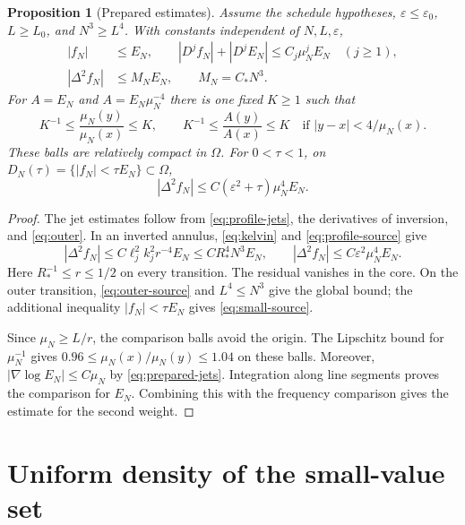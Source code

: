 \documentclass[11pt,twoside,leqno]{article}
\numberwithin{equation}{section}
\newtheorem{proposition}[theorem]{Proposition}
\theoremstyle{definition}
\theoremstyle{remark}
\newcommand{\eps}{\varepsilon}
\newcommand{\Om}{\Omega}
\begin{document}
\begin{proposition}[Prepared estimates]\label{prop:prepared}
Assume the schedule hypotheses, $\eps\le\eps_0$, $L\ge L_0$, and
$N^3\ge L^4$. With constants independent of $N,L,\eps$,
\begin{align}
 |f_N|&\le E_N,\qquad
 |D^jf_N|+|D^jE_N|\le C_j\mu_N^jE_N\quad(j\ge1),
                                                    \label{eq:prepared-jets}\\
 |\Delta^2f_N|&\le M_NE_N,\qquad M_N=C_*N^3.         \label{eq:global-source}
\end{align}
For $A=E_N$ and $A=E_N\mu_N^{-4}$ there is one fixed $K\ge1$ such that
\begin{equation}\label{eq:comparison}
 K^{-1}\le\frac{\mu_N(y)}{\mu_N(x)}\le K,\qquad
 K^{-1}\le\frac{A(y)}{A(x)}\le K
 \quad\text{if }|y-x|<4/\mu_N(x).
\end{equation}
These balls are relatively compact in $\Om$. For $0<\tau<1$, on
$D_N(\tau)=\{|f_N|<\tau E_N\}\subset\Om$,
\begin{equation}\label{eq:small-source}
 |\Delta^2f_N|\le C(\eps^2+\tau)\mu_N^4E_N.
\end{equation}
\end{proposition}
\begin{proof}
The jet estimates follow from \eqref{eq:profile-jets}, the derivatives
of inversion, and \eqref{eq:outer}. In an inverted annulus,
\eqref{eq:kelvin} and \eqref{eq:profile-source} give
\[
 |\Delta^2f_N|\le C\ell_j^2k_j^2r^{-4}E_N
 \le CR_*^4N^3E_N,\qquad
 |\Delta^2f_N|\le C\eps^2\mu_N^4E_N.
\]
Here $R_*^{-1}\le r\le1/2$ on every transition. The residual vanishes in the core. On the outer transition,
\eqref{eq:outer-source} and $L^4\le N^3$ give the global bound;
the additional inequality $|f_N|<\tau E_N$ gives
\eqref{eq:small-source}.

Since $\mu_N\ge L/r$, the comparison balls avoid the origin. The
Lipschitz bound for $\mu_N^{-1}$ gives
$0.96\le\mu_N(x)/\mu_N(y)\le1.04$ on these balls.
Moreover, $|\nabla\log E_N|\le C\mu_N$ by \eqref{eq:prepared-jets}.
Integration along line segments proves the comparison for $E_N$.
Combining this with the frequency comparison gives the estimate for
the second weight.
\end{proof}

\section{Uniform density of the small-value set}\label{sec:density}
\end{document}

